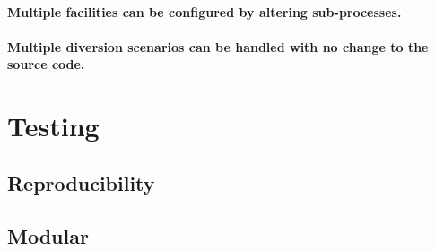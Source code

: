 \paragraph{Multiple facilities can be configured by altering sub-processes.}

\paragraph{Multiple diversion scenarios can be handled with no change to the source code.}


\section{Testing}

\subsection{Reproducibility}

\subsection{Modular}
